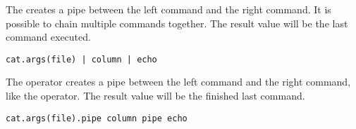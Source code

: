 %

The \Operator{|} creates a pipe between the left command and the right command.
It is possible to chain multiple commands together. The result value will be the
last command executed.

\begin{lstlisting}[style=Groovybash, label={lst:example_pipe1_op}]
cat.args(file) | column | echo
\end{lstlisting}

%

The  operator creates a pipe between the left command 
and the right command, like the \Operator{|} operator. The result value will be the
finished last command.

\begin{lstlisting}[style=Groovybash, label={lst:example_pipe2_op}]
cat.args(file).pipe column pipe echo
\end{lstlisting}

